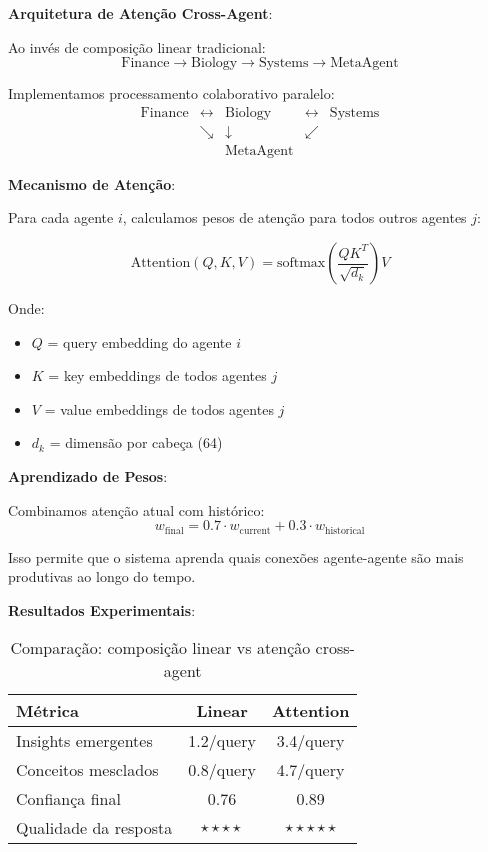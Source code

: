 \documentclass[11pt]{article}
\begin{document}
\textbf{Arquitetura de Atenção Cross-Agent}:

Ao invés de composição linear tradicional:
\begin{equation}
\text{Finance} \rightarrow \text{Biology} \rightarrow \text{Systems} \rightarrow \text{MetaAgent}
\end{equation}

Implementamos processamento colaborativo paralelo:
\begin{equation}
\begin{matrix}
\text{Finance} & \leftrightarrow & \text{Biology} & \leftrightarrow & \text{Systems} \\
& \searrow & \downarrow & \swarrow & \\
& & \text{MetaAgent} & &
\end{matrix}
\end{equation}

\textbf{Mecanismo de Atenção}:

Para cada agente $i$, calculamos pesos de atenção para todos outros agentes $j$:

\begin{equation}
\text{Attention}(Q, K, V) = \text{softmax}\left(\frac{QK^T}{\sqrt{d_k}}\right)V
\end{equation}

Onde:
\begin{itemize}
    \item $Q$ = query embedding do agente $i$
    \item $K$ = key embeddings de todos agentes $j$
    \item $V$ = value embeddings de todos agentes $j$
    \item $d_k$ = dimensão por cabeça (64)
\end{itemize}

\textbf{Aprendizado de Pesos}:

Combinamos atenção atual com histórico:
\begin{equation}
w_{\text{final}} = 0.7 \cdot w_{\text{current}} + 0.3 \cdot w_{\text{historical}}
\end{equation}

Isso permite que o sistema aprenda quais conexões agente-agente são mais produtivas ao longo do tempo.

\textbf{Resultados Experimentais}:

\begin{table}[H]
\centering
\begin{tabular}{@{}lcc@{}}
\toprule
\textbf{Métrica} & \textbf{Linear} & \textbf{Attention} \\ \midrule
Insights emergentes & 1.2/query & 3.4/query \\
Conceitos mesclados & 0.8/query & 4.7/query \\
Confiança final & 0.76 & 0.89 \\
Qualidade da resposta & $\star\star\star\star$ & $\star\star\star\star\star$ \\
\bottomrule
\end{tabular}
\caption{Comparação: composição linear vs atenção cross-agent}
\end{table}
\end{document}
